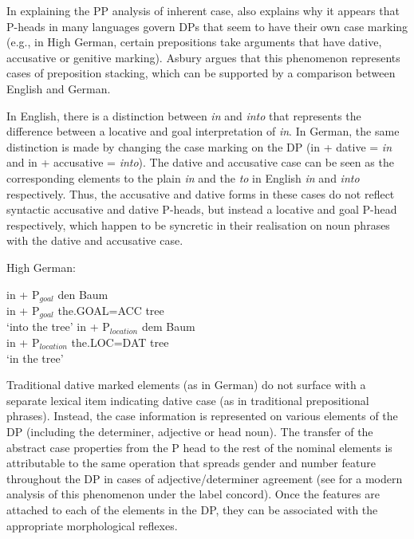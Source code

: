 In explaining the PP analysis of inherent case, \cite{Asbury.2005} also explains why it appears that P-heads in many languages govern DPs that seem to have their own case marking (e.g., in High German, certain prepositions take arguments that have dative, accusative or genitive marking). Asbury argues that this phenomenon represents cases of preposition stacking, which can be supported by a comparison between English and German. 

In English, there is a distinction between \textit{in} and \textit{into} that represents the difference between a locative and goal interpretation of \textit{in}. In German, the same distinction is made by changing the case marking on the DP (in + dative = \textit{in} and in + accusative = \textit{into}). The dative and accusative case can be seen as the corresponding elements to the plain \textit{in} and the \textit{to} in English \textit{in} and \textit{into} respectively. Thus, the accusative and dative forms in these cases do not reflect syntactic accusative and dative P-heads, but instead a locative and goal P-head respectively, which happen to be syncretic in their realisation on noun phrases with the dative and accusative case.

\begin{exe}
	\ex High German:\label{ex:hg-Pcomp}
	\begin{xlist}
		\ex \gll in + P$_{goal}$ den Baum\\
			 in + P$_{goal}$ the.GOAL=ACC tree\\
			 \trans `into the tree'
		\ex \gll in + P$_{location}$ dem Baum\\
			 in + P$_{location}$ the.LOC=DAT tree\\
			 \trans `in the tree'
	\end{xlist}

\end{exe}

Traditional dative marked elements (as in German) do not surface with a separate lexical item indicating dative case (as in traditional prepositional phrases). Instead, the case information is represented on various elements of the DP (including the determiner, adjective or head noun). The transfer of the abstract case properties from the P head to the rest of the nominal elements is attributable to the same operation that spreads gender and number feature throughout the DP in cases of adjective/determiner agreement (see \citealt{Norris.2012} for a modern analysis of this phenomenon under the label concord). Once the features are attached to each of the elements in the DP, they can be associated with the appropriate morphological reflexes.

